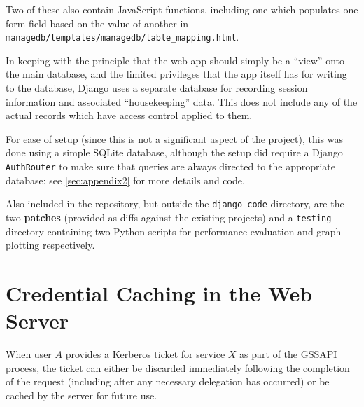 \documentclass[12pt]{report}
\begin{document}
Two of these also contain JavaScript functions, including one which populates one form field based on the value of another in \verb+managedb/templates/managedb/table_mapping.html+.

In keeping with the principle that the web app should simply be a ``view'' onto the main database, and the limited privileges that the app itself has for writing to the database, Django uses a separate database for recording session information and associated ``housekeeping'' data. This does not include any of the actual records which have access control applied to them.

For ease of setup (since this is not a significant aspect of the project), this was done using a simple SQLite database, although the setup did require a Django \texttt{AuthRouter} to make sure that queries are always directed to the appropriate database: see \autoref{sec:appendix2} for more details and code.

Also included in the repository, but outside the \verb+django-code+ directory, are the two \textbf{patches} (provided as diffs against the existing projects) and a \verb+testing+ directory containing two Python scripts for performance evaluation and graph plotting respectively.

\section{Credential Caching in the Web Server}
\label{sec:credential_caching}
When user $A$ provides a Kerberos ticket for service $X$ as part of the GSSAPI process, the ticket can either be discarded immediately following the completion of the request (including after any necessary delegation has occurred) or be cached by the server for future use.
\end{document}
